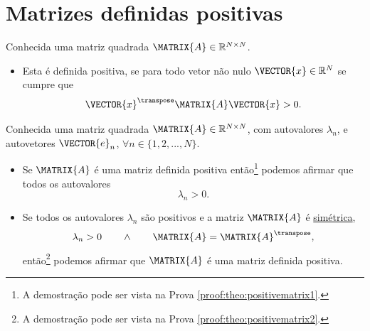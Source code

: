 \section{ Matrizes definidas positivas}


\begin{definition}\label{def:positivematrix0}
Conhecida uma matriz quadrada $\MATRIX{A} \in \mathbb{R}^{N \times N}$. 
\begin{itemize}
\item Esta é definida positiva, se para todo vetor não nulo $\VECTOR{x} \in \mathbb{R}^N$
se cumpre que \cite[pp. 159]{golub2013matrix} 
\begin{equation}
\VECTOR{x}^{\transpose} \MATRIX{A} \VECTOR{x} > 0.
\end{equation}
\end{itemize}
\end{definition}




\begin{theorem}\label{theo:positivematrix1}
Conhecida uma matriz quadrada $\MATRIX{A} \in \mathbb{R}^{N \times N}$, com  autovalores $\lambda_n$,
e autovetores $\VECTOR{e}_n$, $\forall n \in \{1, 2, ..., N\}$.
\begin{itemize}
\item Se $\MATRIX{A}$ é uma matriz definida positiva então\footnote{\label{foot:theo:positivematrix1}A
demostração pode ser vista na Prova \ref{proof:theo:positivematrix1}.}  
podemos afirmar que todos os autovalores 
\begin{equation}
\lambda_n > 0.
\end{equation}
\item Se todos os autovalores $\lambda_n$ são positivos e a matriz $\MATRIX{A}$ é \hyperref[def:symmetricmatrix0]{simétrica},
\begin{equation}
\lambda_n > 0 \qquad \wedge \qquad \MATRIX{A}=\MATRIX{A}^{\transpose},
\end{equation}
 então\footnote{A
demostração pode ser vista na Prova \ref{proof:theo:positivematrix2}.} 
podemos afirmar que $\MATRIX{A}$ é uma matriz definida positiva.
\end{itemize}
\end{theorem}

